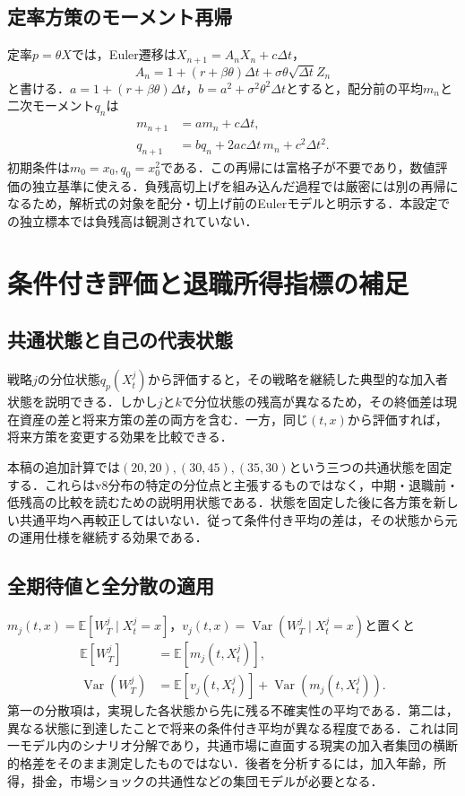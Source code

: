 \documentclass[11pt,a4paper]{article}
\numberwithin{equation}{section}
\numberwithin{table}{section}
\numberwithin{figure}{section}
\theoremstyle{plain}
\theoremstyle{definition}
\newcommand{\E}{\mathbb{E}}
\DeclareMathOperator{\Var}{Var}
\begin{document}
\subsection{定率方策のモーメント再帰}
定率$p=\theta X$では，Euler遷移は$X_{n+1}=A_nX_n+c\Delta t$，
\begin{equation}
A_n=1+(r+\beta\theta)\Delta t+\sigma\theta\sqrt{\Delta t}Z_n
\end{equation}
と書ける．$a=1+(r+\beta\theta)\Delta t$，$b=a^2+\sigma^2\theta^2\Delta t$とすると，配分前の平均$m_n$と二次モーメント$q_n$は
\begin{align}
m_{n+1}&=a m_n+c\Delta t,\\
q_{n+1}&=b q_n+2ac\Delta t\,m_n+c^2\Delta t^2.
\end{align}
初期条件は$m_0=x_0,q_0=x_0^2$である．この再帰には富格子が不要であり，数値評価の独立基準に使える．負残高切上げを組み込んだ過程では厳密には別の再帰になるため，解析式の対象を配分・切上げ前のEulerモデルと明示する．本設定での独立標本では負残高は観測されていない．

\FloatBarrier
\section{条件付き評価と退職所得指標の補足}
\label{app:outcomes}
\subsection{共通状態と自己の代表状態}
戦略$j$の分位状態$q_p(X_t^j)$から評価すると，その戦略を継続した典型的な加入者状態を説明できる．しかし$j$と$k$で分位状態の残高が異なるため，その終価差は現在資産の差と将来方策の差の両方を含む．一方，同じ$(t,x)$から評価すれば，将来方策を変更する効果を比較できる．

本稿の追加計算では$(20,20),(30,45),(35,30)$という三つの共通状態を固定する．これらはv8分布の特定の分位点と主張するものではなく，中期・退職前・低残高の比較を読むための説明用状態である．状態を固定した後に各方策を新しい共通平均へ再較正してはいない．従って条件付き平均の差は，その状態から元の運用仕様を継続する効果である．

\subsection{全期待値と全分散の適用}
$m_j(t,x)=\E[W_T^j\mid X_t^j=x]$，$v_j(t,x)=\Var(W_T^j\mid X_t^j=x)$と置くと
\begin{align}
\E[W_T^j]&=\E[m_j(t,X_t^j)],\\
\Var(W_T^j)&=\E[v_j(t,X_t^j)]+\Var(m_j(t,X_t^j)).
\end{align}
第一の分散項は，実現した各状態から先に残る不確実性の平均である．第二は，異なる状態に到達したことで将来の条件付き平均が異なる程度である．これは同一モデル内のシナリオ分解であり，共通市場に直面する現実の加入者集団の横断的格差をそのまま測定したものではない．後者を分析するには，加入年齢，所得，掛金，市場ショックの共通性などの集団モデルが必要となる．
\end{document}
